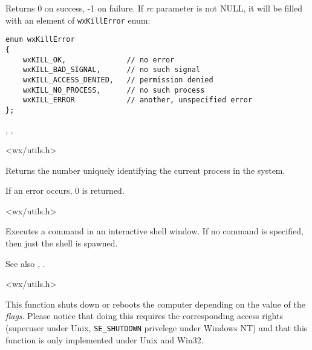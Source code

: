 Returns 0 on success, -1 on failure. If {\it rc} parameter is not NULL, it will
be filled with an element of {\tt wxKillError} enum:

\begin{verbatim}
enum wxKillError
{
    wxKILL_OK,              // no error
    wxKILL_BAD_SIGNAL,      // no such signal
    wxKILL_ACCESS_DENIED,   // permission denied
    wxKILL_NO_PROCESS,      // no such process
    wxKILL_ERROR            // another, unspecified error
};
\end{verbatim}


,\rtfsp
{},\rtfsp
{}


<wx/utils.h>


\label{wxgetprocessid}


Returns the number uniquely identifying the current process in the system.

If an error occurs, $0$ is returned.


<wx/utils.h>


\label{wxshell}


Executes a command in an interactive shell window. If no command is
specified, then just the shell is spawned.

See also , .


<wx/utils.h>


\label{wxshutdown}


This function shuts down or reboots the computer depending on the value of the
{\it flags}. Please notice that doing this requires the corresponding access
rights (superuser under Unix, {\tt SE\_SHUTDOWN} privelege under Windows NT)
and that this function is only implemented under Unix and Win32.


